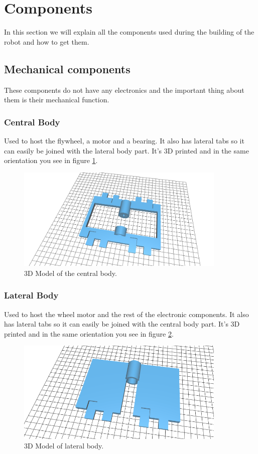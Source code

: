 \section{Components}
In this section we will explain all the components
used during the building of the robot and how to get them.

\subsection{Mechanical components}
These components do not have any electronics and the important
thing about them is their mechanical function.
\subsubsection{Central Body}

Used to host the flywheel, a motor and a bearing. It also has lateral
tabs so it can easily be joined with the lateral body part.
It's 3D printed and in the same orientation you see in figure
\ref{fig: central body}.
\begin{figure}[H]
    \centering
    \includegraphics[width=10cm]{img/components/central_body.png}
    \caption{3D Model of the central body.}
    \label{fig: central body}
\end{figure}

\subsubsection{Lateral Body}
Used to host the wheel motor and the rest of the electronic components.
It also has lateral tabs so it can easily be joined with the central body part.
It's 3D printed and in the same orientation you see in figure
\ref{fig: lateral body}.
\begin{figure}[H]
    \centering
    \includegraphics[width=10cm]{img/components/lateral_body.png}
    \caption{3D Model of lateral body.}
    \label{fig: lateral body}
\end{figure}
